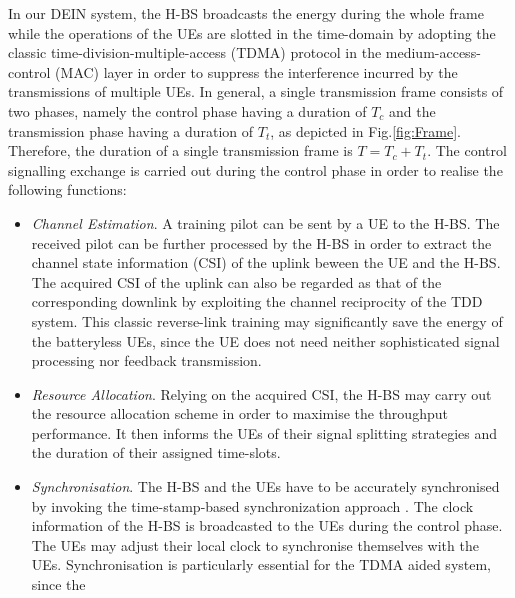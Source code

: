 \documentclass[12pt,draft,onecolumn,journal]{IEEEtran}
\begin{document}
In our DEIN system, the H-BS broadcasts the energy during the whole frame while the operations of the UEs are slotted in the time-domain by adopting the classic time-division-multiple-access (TDMA) protocol in the medium-access-control (MAC) layer in order to suppress the interference incurred by the transmissions of multiple UEs. In general, a single transmission frame consists of two phases, namely the control phase having a duration of $T_c$ and the transmission phase having a duration of $T_t$, as depicted in Fig.\ref{fig:Frame}. Therefore, the duration of a single transmission frame is $T=T_c+T_t$. The control signalling exchange is carried out during the control phase in order to realise the following functions:
\begin{itemize}
	\item \textit{Channel Estimation}. A training pilot can be sent by a UE to the H-BS. The received pilot can be further processed by the H-BS in order to extract the channel state information (CSI) of the uplink beween the UE and the H-BS. The acquired CSI of the uplink can also be regarded as that of the corresponding downlink by exploiting the channel reciprocity of the TDD system. This classic reverse-link training may significantly save the energy of the batteryless UEs, since the UE does not need neither sophisticated signal processing nor feedback transmission.
	\item \textit{Resource Allocation}. Relying on the acquired CSI, the H-BS may carry out the resource allocation scheme in order to maximise the throughput performance. It then informs the UEs of their signal splitting strategies and the duration of their assigned time-slots.
	\item \textit{Synchronisation}. The H-BS and the UEs have to be accurately synchronised by invoking the time-stamp-based synchronization approach \cite{7046389}. The clock information of the H-BS is broadcasted to the UEs during the control phase. The UEs may adjust their local clock to synchronise themselves with the UEs. Synchronisation is particularly essential for the TDMA aided system, since the
\end{itemize}
\end{document}
